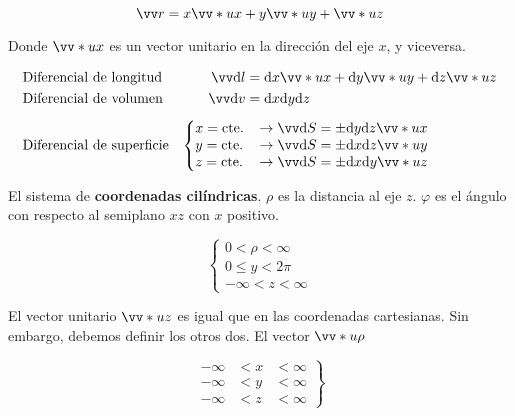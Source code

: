 \documentclass[10pt]{book}
\begin{document}
\[ \vec{r} = x \vv*{u}{x} + y \vv*{u}{y} + \vv*{u}{z} \]

Donde $\vv*{u}{x}$ es un vector unitario en la dirección del eje $x$, y viceversa.

\begin{align*}
                        & \text{Diferencial de longitud}   & \vec{\dd l}  & = \dd x \vv*{u}{x} + \dd y \vv*{u}{y} + \dd z \vv*{u}{z} \\
                        & \text{Diferencial de volumen}    & \vec{\dd v}  & = \dd x  \dd y  \dd z                                    \\[5 pt]
                        & \text{Diferencial de superficie} & \left\lbrace
  \begin{matrix*}[l]
    x = \text{cte.} \\
    y = \text{cte.} \\
    z = \text{cte.}
  \end{matrix*} \right. &
  \begin{matrix*}[l]
    \quad \rightarrow \vec{\dd S} = \pm \dd y \dd z \vv*{u}{x}\\
    \quad \rightarrow \vec{\dd S} = \pm \dd x \dd z \vv*{u}{y}\\
    \quad \rightarrow \vec{\dd S} = \pm \dd x \dd y \vv*{u}{z}
  \end{matrix*}                                                                          \\
\end{align*}

El sistema de \textbf{coordenadas cilíndricas}. $\rho$ es la distancia al eje $z$. $\varphi$ es el ángulo con respecto al semiplano $xz$ con $x$ positivo.

\[\left\lbrace \begin{matrix}
    0 < \rho < \infty \\
    0 \leq y < 2\pi   \\
    -\infty < z < \infty
  \end{matrix} \right. \]

El vector unitario $\vv*{u}{z}$ es igual que en las coordenadas cartesianas. Sin embargo, debemos definir los otros dos. El vector $\vv*{u}{\rho}$

\[ \left.
  \begin{matrix}
    -\infty & < x & < \infty \\
    -\infty & < y & < \infty \\
    -\infty & < z & < \infty
  \end{matrix} \right\rbrace \]
\end{document}
